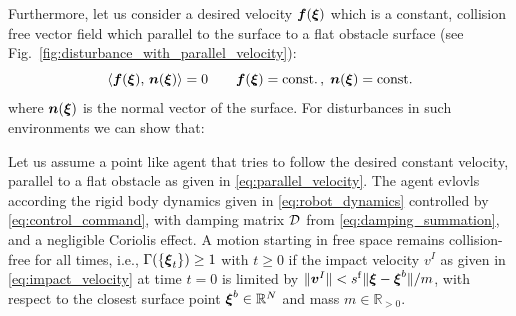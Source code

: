 
Furthermore, let us consider a desired velocity $\boldsymbol{f}(\boldsymbol{\xi})$ which is a constant, collision free vector field which parallel to the surface to a flat obstacle surface (see Fig.~\ref{fig:disturbance_with_parallel_velocity}):
\begin{equation}
	\dotprod{\vect f(\vecs \xi)}{\vecs n(\vecs \xi)} = 0
	 \qquad
\vect f(\vecs \xi) = \text{const.}
\, , \;
\vect n(\vecs \xi) = \text{const.}
\label{eq:parallel_velocity}
\end{equation}
where $\boldsymbol{n}(\boldsymbol{\xi})$ is the normal vector of the surface. For disturbances in such environments we can show that:

\begin{lemma} \label{lemma:damping_collision_avoidance}
	Let us assume a point like agent that tries to follow the desired constant velocity, parallel to a flat obstacle as given in \eqref{eq:parallel_velocity}. The agent evlovls according the rigid body dynamics given in \eqref{eq:robot_dynamics} controlled by \eqref{eq:control_command}, with damping matrix $\mathcal{D}$ from \eqref{eq:damping_summation}, and a negligible Coriolis effect.
	A motion starting in free space remains collision-free for all times, i.e., $\Gamma( \{\boldsymbol{\xi}_t\}) \geq 1$ with $t \geq 0$ if the impact velocity $v^I$ as given in \eqref{eq:impact_velocity} at time $t=0$ is limited by $\| \boldsymbol{v}^I\| < s^{\mathrm{f}} \| \boldsymbol{\xi} - \boldsymbol{\xi}^b \| / m$, with respect to the closest surface point $\boldsymbol{\xi}^b \in \mathbb{R}^N$ and mass $m \in \mathbb{R}_{>0}$.
\end{lemma}

